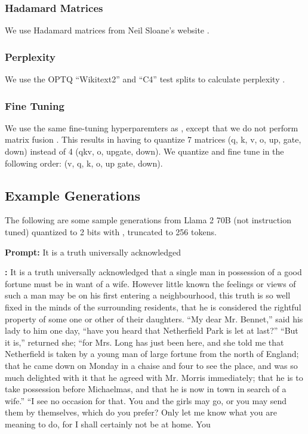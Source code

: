 \subsubsection{Hadamard Matrices}

We use Hadamard matrices from Neil Sloane's website \cite{neilsloane}.

\subsubsection{Perplexity}

We use the OPTQ ``Wikitext2'' and ``C4'' test splits to calculate perplexity \cite{optq}.

\subsubsection{Fine Tuning}

We use the same fine-tuning hyperparemters as \qs, except that we do not perform matrix fusion \cite{tseng2024quip}.
This results in having to quantize 7 matrices (q, k, v, o, up, gate, down) instead of 4 (qkv, o, upgate, down).
We quantize and fine tune in the following order: (v, q, k, o, up gate, down).

\subsection{Example Generations}
The following are some sample generations from Llama 2 70B (not instruction tuned) quantized to 2 bits with \qt, truncated to 256 tokens.

\begin{tcolorbox}
\textbf{Prompt:}  It is a truth universally acknowledged
\vspace{1em}

\textbf{\qt:}   
It is a truth universally acknowledged that a single man in possession of a good fortune must be in want of a wife. However little known the feelings or views of such a man may be on his first entering a neighbourhood, this truth is so well fixed in the minds of the surrounding residents, that he is considered the rightful property of some one or other of their daughters.
“My dear Mr. Bennet,” said his lady to him one day, “have you heard that Netherfield Park is let at last?”
“But it is,” returned she; “for Mrs. Long has just been here, and she told me that Netherfield is taken by a young man of large fortune from the north of England; that he came down on Monday in a chaise and four to see the place, and was so much delighted with it that he agreed with Mr. Morris immediately; that he is to take possession before Michaelmas, and that he is now in town in search of a wife.”
“I see no occasion for that. You and the girls may go, or you may send them by themselves, which do you prefer? Only let me know what you are meaning to do, for I shall certainly not be at home. You
\end{tcolorbox}

